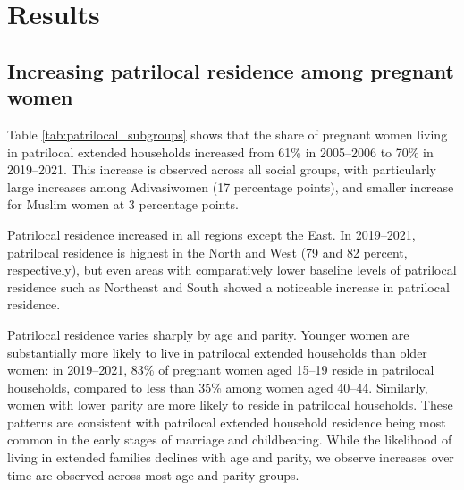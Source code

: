 \documentclass[10pt,twoside,reqno]{article}
\begin{document}
\section{Results}
\subsection{Increasing patrilocal residence among pregnant women}

Table \ref{tab:patrilocal_subgroups} shows that the share of pregnant women living in patrilocal extended households increased from 61\% in 2005–2006 to 70\% in 2019–2021. This increase is observed across all social groups, with particularly large increases among Adivasiwomen (17 percentage points), and smaller increase for Muslim women at 3 percentage points.

Patrilocal residence increased in all regions except the East. In 2019--2021, patrilocal residence is highest in the North and West (79 and 82 percent, respectively), but even areas with comparatively lower baseline levels of patrilocal residence such as Northeast and South showed a noticeable increase in patrilocal residence.  

Patrilocal residence varies sharply by age and parity. Younger women are substantially more likely to live in patrilocal extended households than older women: in 2019–2021, 83\% of pregnant women aged 15–19 reside in patrilocal households, compared to less than 35\% among women aged 40–44. Similarly, women with lower parity are more likely to reside in patrilocal households. These patterns are consistent with patrilocal extended household residence being most common in the early stages of marriage and childbearing. While the likelihood of living in extended families declines with age and parity, we observe increases over time are observed across most age and parity groups. 
\end{document}
